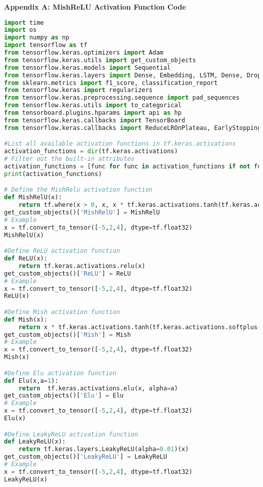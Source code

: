\textbf{Appendix A: MishReLU Activation Function Code}
\label{app:A}\\


\begin{lstlisting}[language=Python, ]
import time
import os
import numpy as np
import tensorflow as tf
from tensorflow.keras.optimizers import Adam
from tensorflow.keras.utils import get_custom_objects
from tensorflow.keras.models import Sequential
from tensorflow.keras.layers import Dense, Embedding, LSTM, Dense, Dropout, Activation,Bidirectional 
from sklearn.metrics import f1_score, classification_report
from tensorflow.keras import regularizers
from tensorflow.keras.preprocessing.sequence import pad_sequences
from tensorflow.keras.utils import to_categorical
from tensorboard.plugins.hparams import api as hp
from tensorflow.keras.callbacks import TensorBoard
from tensorflow.keras.callbacks import ReduceLROnPlateau, EarlyStopping

#List all available activation functions in tf.keras.activations
activation_functions = dir(tf.keras.activations)
# Filter out the built-in attributes
activation_functions = [func for func in activation_functions if not func.startswith('__')]
print(activation_functions)

# Define the MishRelu activation function
def MishRelU(x):
    return tf.where(x > 0, x, x * tf.keras.activations.tanh(tf.keras.activations.softplus(x)))
get_custom_objects()['MishRelU'] = MishRelU
# Example
x = tf.convert_to_tensor([-5,2,4], dtype=tf.float32)
MishRelU(x)

#Define ReLU activation function
def ReLU(x):
    return tf.keras.activations.relu(x)
get_custom_objects()['ReLU'] = ReLU
# Example
x = tf.convert_to_tensor([-5,2,4], dtype=tf.float32)
ReLU(x)

#Define Mish activation function
def Mish(x):
    return x * tf.keras.activations.tanh(tf.keras.activations.softplus(x))
get_custom_objects()['Mish'] = Mish
# Example
x = tf.convert_to_tensor([-5,2,4], dtype=tf.float32)
Mish(x)

#Define Elu activation function
def Elu(x,a=1):
    return  tf.keras.activations.elu(x, alpha=a)    
get_custom_objects()['Elu'] = Elu
# Example
x = tf.convert_to_tensor([-5,2,4], dtype=tf.float32)
Elu(x)

#Define LeakyReLU activation function
def LeakyReLU(x):
    return tf.keras.layers.LeakyReLU(alpha=0.01)(x)
get_custom_objects()['LeakyReLU'] = LeakyReLU
# Example
x = tf.convert_to_tensor([-5,2,4], dtype=tf.float32)
LeakyReLU(x)


\end{lstlisting}
